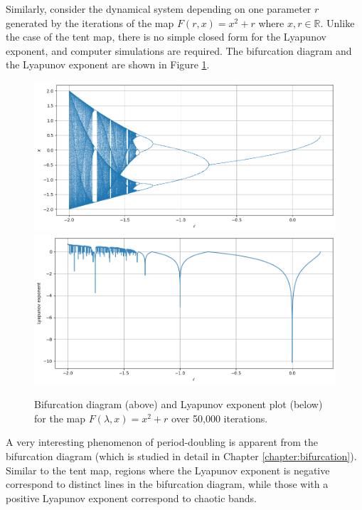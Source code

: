 \begin{exmp}
	Similarly, consider the dynamical system depending on one parameter $r$ generated by the iterations of the map
    $F(r,x)=x^2+r$ where $x,r \in \mathbb{R}$.
	Unlike the case of the tent map, there is no simple closed form for the Lyapunov exponent, and computer simulations are required. 
	The bifurcation diagram and the Lyapunov exponent are shown in Figure \ref{fig:lyapunov_x^2}.
    \begin{figure}
        \centering
        \includegraphics[width=1\linewidth]{Bifurcation Images/bifurcation_quadratic.png}
        \includegraphics[width=1\linewidth]{Bifurcation Images/lypaunov_quadratic.png}
        \caption{Bifurcation diagram (above) and Lyapunov exponent plot (below) for the map $F(\lambda,x)=x^2+r$ over 50,000 iterations.}
        \label{fig:lyapunov_x^2}
    \end{figure}
	A very interesting phenomenon of period-doubling is apparent from the bifurcation diagram (which is studied in detail in Chapter \ref{chapter:bifurcation}).
	Similar to the tent map, regions where the Lyapunov exponent is negative correspond to distinct lines in the bifurcation diagram, while those with a positive Lyapunov exponent correspond to chaotic bands.
\end{exmp}


